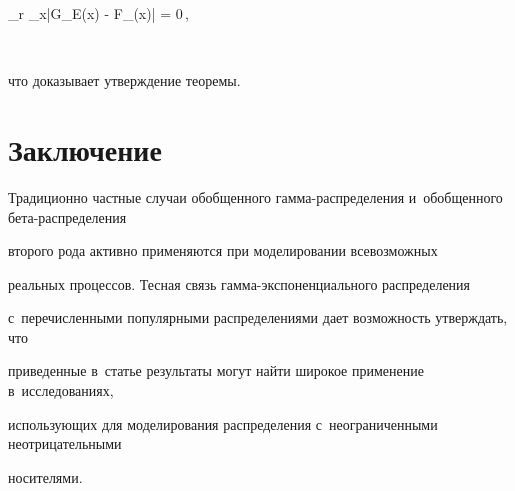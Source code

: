 \lim\limits_{r} \sup\limits_x\left|G_E(x) - F_\beta(x)\right| = 0\,,


$$


что доказывает утверждение теоремы.








\section{Заключение}





Традиционно частные случаи обобщенного гам\-ма-рас\-пре\-де\-ле\-ния и~обобщенного бе\-та-рас\-пре\-де\-ле\-ния 


второго рода активно применяются при моделировании всевозможных 


реальных процессов. Тесная связь гам\-ма-экс\-по\-нен\-ци\-аль\-но\-го распределения 


с~перечисленными популярными распределениями дает возможность утверждать, что 


приведенные в~статье результаты могут найти широкое применение в~исследованиях, 


использующих для моделирования распределения с~неограниченными неотрицательными 


носителями.






